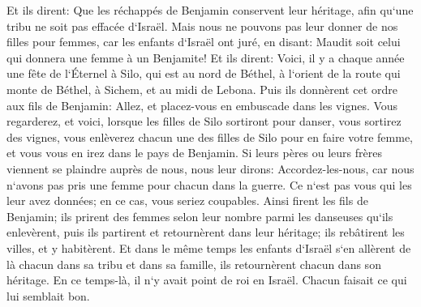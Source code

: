 \verse Et ils dirent: Que les réchappés de Benjamin conservent leur héritage, afin qu`une tribu ne soit pas effacée d`Israël. 
\verse Mais nous ne pouvons pas leur donner de nos filles pour femmes, car les enfants d`Israël ont juré, en disant: Maudit soit celui qui donnera une femme à un Benjamite! 
\verse Et ils dirent: Voici, il y a chaque année une fête de l`Éternel à Silo, qui est au nord de Béthel, à l`orient de la route qui monte de Béthel, à Sichem, et au midi de Lebona. 
\verse Puis ils donnèrent cet ordre aux fils de Benjamin: Allez, et placez-vous en embuscade dans les vignes. 
\verse Vous regarderez, et voici, lorsque les filles de Silo sortiront pour danser, vous sortirez des vignes, vous enlèverez chacun une des filles de Silo pour en faire votre femme, et vous vous en irez dans le pays de Benjamin. 
\verse Si leurs pères ou leurs frères viennent se plaindre auprès de nous, nous leur dirons: Accordez-les-nous, car nous n`avons pas pris une femme pour chacun dans la guerre. Ce n`est pas vous qui les leur avez données; en ce cas, vous seriez coupables. 
\verse Ainsi firent les fils de Benjamin; ils prirent des femmes selon leur nombre parmi les danseuses qu`ils enlevèrent, puis ils partirent et retournèrent dans leur héritage; ils rebâtirent les villes, et y habitèrent. 
\verse Et dans le même temps les enfants d`Israël s`en allèrent de là chacun dans sa tribu et dans sa famille, ils retournèrent chacun dans son héritage. 
\verse En ce temps-là, il n`y avait point de roi en Israël. Chacun faisait ce qui lui semblait bon. 

